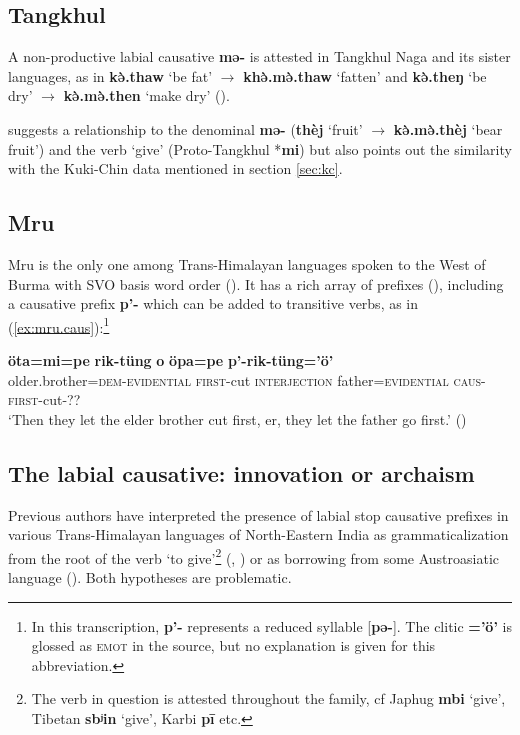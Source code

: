 \documentclass[oneside,a4paper,11pt]{article}
\newcommand{\ipa}[1]{\textbf{{\phon\mbox{#1}}}} %
\newcommand{\forme}[2]{\ipa{#1} `#2'}
\newcommand{\refb}[1]{(\ref{#1})}
\begin{document}
\subsection{Tangkhul} \label{sec:tangkhul}
A non-productive labial causative \ipa{mə-} is attested in Tangkhul Naga and its sister languages, as in \forme{kə̀.thaw}{be fat} $\rightarrow$ \forme{khə̀.mə̀.thaw}{fatten} and \forme{kə̀.theŋ}{be dry}  $\rightarrow$ \forme{kə̀.mə̀.then}{make dry}  (\citealt[23]{mortensen03tangkhul}). 

\citet[23]{mortensen03tangkhul} suggests a relationship to the denominal \ipa{mə-} (\forme{thèj}{fruit}  $\rightarrow$ \forme{kə̀.mə̀.thèj}{bear fruit}) and the verb `give' (Proto-Tangkhul *\ipa{mi}) but also points out the similarity with the Kuki-Chin data mentioned in section \ref{sec:kc}.

\subsection{Mru} \label{sec:mru}
Mru is the only one among Trans-Himalayan languages spoken to the West of Burma with SVO basis word order (\citealt{peterson05mru}). It has a rich array of prefixes (\citealt{williams08directionals}), including a causative prefix \ipa{p'-} which can be added to transitive verbs, as in \refb{ex:mru.caus}:\footnote{In this transcription, \ipa{p'-} represents a reduced syllable [\ipa{pə-}]. The clitic \ipa{=’ö’} is glossed as \textsc{emot} in the source, but no explanation is given for this abbreviation.}
 
\begin{exe}
\ex \label{ex:mru.caus}
\gll
\ipa{öta=mi=pe} \ipa{rik-tüng} \ipa{o} \ipa{öpa=pe} \ipa{p’-rik-tüng=’ö’} \\
older.brother=\textsc{dem-evidential} \textsc{first}-cut \textsc{interjection} father=\textsc{evidential} \textsc{caus-first}-cut-?? \\
\glt `Then they let the elder brother cut first, er, they let the father go first.' (\citealt[52]{williams08directionals})
\end{exe}
 
\subsection{The labial causative: innovation or archaism} \label{sec:innovation}
Previous authors have interpreted the presence of labial stop causative prefixes in various Trans-Himalayan languages of North-Eastern India as  grammaticalization from the root of the verb `to give'\footnote{The verb in question is attested throughout the family, cf Japhug \forme{mbi}{give}, Tibetan \forme{sbʲin}{give}, Karbi \ipa{pī} etc.}
(\citealt[132]{matisoff03}, \citealt{jenny15give}) or as borrowing from some Austroasiatic language (\citealt{maspero46, diffloth08parallels, konnerth15cisloc, delancey15adjectival}). Both hypotheses are problematic. 
\end{document}
